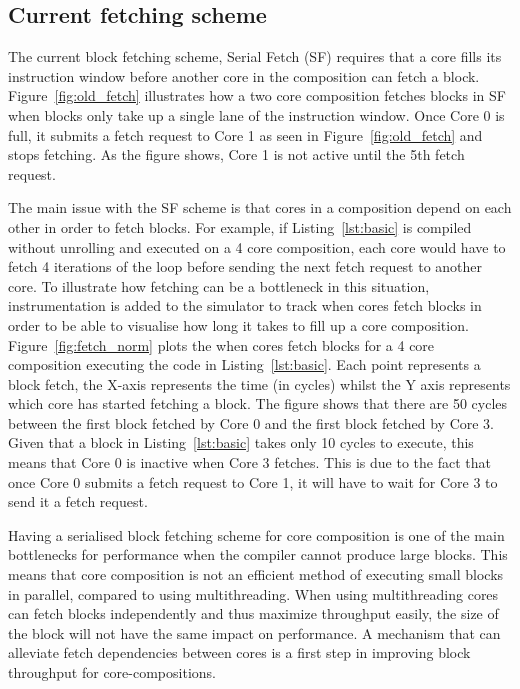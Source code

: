 \subsection{Current fetching scheme}
	
The current block fetching scheme, Serial Fetch (SF) requires that a core fills its instruction window before another core in the composition can fetch a block.
Figure~\ref{fig:old_fetch} illustrates how a two core composition fetches blocks in SF when blocks only take up a single lane of the instruction window.
Once Core 0 is full, it submits a fetch request to Core 1 as seen in Figure~\ref{fig:old_fetch} and stops fetching.
As the figure shows, Core 1 is not active until the 5th fetch request.

The main issue with the SF scheme is that cores in a composition depend on each other in order to fetch blocks.
For example, if Listing~\ref{lst:basic} is compiled without unrolling and executed on a 4 core composition, each core would have to fetch 4 iterations of the loop before sending the next fetch request to another core.
To illustrate how fetching can be a bottleneck in this situation, instrumentation is added to the simulator to track when cores fetch blocks in order to be able to visualise how long it takes to fill up a core composition.
Figure~\ref{fig:fetch_norm} plots the when cores fetch blocks for a 4 core composition executing the code in Listing~\ref{lst:basic}.
Each point represents a block fetch, the X-axis represents the time (in cycles) whilst the Y axis represents which core has started fetching a block.
The figure shows that there are 50 cycles between the first block fetched by Core 0 and the first block fetched by Core 3.
Given that a block in Listing~\ref{lst:basic} takes only 10 cycles to execute, this means that Core 0 is inactive when Core 3 fetches.
This is due to the fact that once Core 0 submits a fetch request to Core 1, it will have to wait for Core 3 to send it a fetch request.

Having a serialised block fetching scheme for core composition is one of the main bottlenecks for performance when the compiler cannot produce large blocks.
This means that core composition is not an efficient method of executing small blocks in parallel, compared to using multithreading.
When using multithreading cores can fetch blocks independently and thus maximize throughput easily, the size of the block will not have the same impact on performance.
A mechanism that can alleviate fetch dependencies between cores is a first step in improving block throughput for core-compositions.

